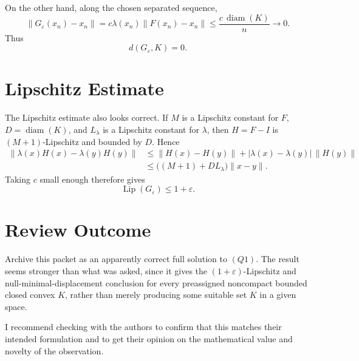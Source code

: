 \documentclass[11pt]{article}
\newcommand{\diam}{\operatorname{diam}}
\begin{document}
On the other hand, along the chosen separated sequence,
\[
  \|G_\varepsilon(x_n)-x_n\|
  =
  c\lambda(x_n)\|F(x_n)-x_n\|
  \leq
  \frac{c\,\diam(K)}{n}
  \longrightarrow 0.
\]
Thus
\[
  d(G_\varepsilon,K)=0.
\]

\section*{Lipschitz Estimate}

The Lipschitz estimate also looks correct. If \(M\) is a Lipschitz constant for
\(F\), \(D=\diam(K)\), and \(L_\lambda\) is a Lipschitz constant for
\(\lambda\), then \(H=F-I\) is \((M+1)\)-Lipschitz and bounded by \(D\). Hence
\[
\begin{aligned}
  \|\lambda(x)H(x)-\lambda(y)H(y)\|
  &\leq \|H(x)-H(y)\|
       +|\lambda(x)-\lambda(y)|\,\|H(y)\| \\
  &\leq \bigl((M+1)+D L_\lambda\bigr)\|x-y\|.
\end{aligned}
\]
Taking \(c\) small enough therefore gives
\[
  \operatorname{Lip}(G_\varepsilon)\leq 1+\varepsilon.
\]

\section*{Review Outcome}

Archive this packet as an apparently correct full solution to \((Q1)\). The
result seems stronger than what was asked, since it gives the
\((1+\varepsilon)\)-Lipschitz and null-minimal-displacement conclusion for
every preassigned noncompact bounded closed convex \(K\), rather than merely
producing some suitable set \(K\) in a given space.

I recommend checking with the authors to confirm that this matches their
intended formulation and to get their opinion on the mathematical value and
novelty of the observation.
\end{document}
